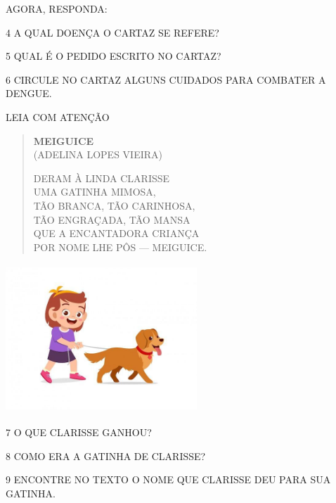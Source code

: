 AGORA, RESPONDA:

\num{4} A QUAL DOENÇA O CARTAZ SE REFERE?


\num{5} QUAL É O PEDIDO ESCRITO NO CARTAZ?


\num{6} CIRCULE NO CARTAZ ALGUNS CUIDADOS PARA COMBATER A DENGUE.


\pagebreak
LEIA COM ATENÇÃO

\begin{minipage}{.7\textwidth}
\begin{verse}
\textbf{MEIGUICE}\\
(ADELINA LOPES VIEIRA)

DERAM À LINDA CLARISSE\\
UMA GATINHA MIMOSA,\\
TÃO BRANCA, TÃO CARINHOSA,\\
TÃO ENGRAÇADA, TÃO MANSA\\
QUE A ENCANTADORA CRIANÇA\\
POR NOME LHE PÔS --- MEIGUICE.
\end{verse}
\end{minipage}
\begin{minipage}{.3\textwidth}
\includegraphics[width=2.83472in,height=2.19792in]{media/image128.jpg}
\end{minipage}

\num{7} O QUE CLARISSE GANHOU?


\num{8} COMO ERA A GATINHA DE CLARISSE?


\num{9} ENCONTRE NO TEXTO O NOME QUE CLARISSE DEU PARA SUA GATINHA.

